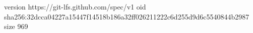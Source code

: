 version https://git-lfs.github.com/spec/v1
oid sha256:32dcca04227a15447f14518b186a32ff026211222c6d255d9d6c5540844b2987
size 969
